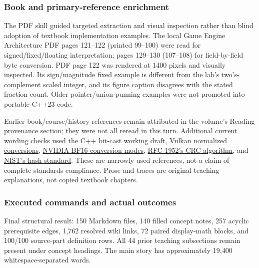 \subsubsection{Book and primary-reference enrichment}\label{appendix-a103e7846d21-book-and-primary-reference-enrichment}

\hypertarget{appendix-a103e7846d21-book-and-primary-reference-enrichment}{}

The PDF skill guided targeted extraction and visual inspection rather than blind adoption of textbook implementation examples. The local Game Engine Architecture PDF pages 121--122 (printed 99--100) were read for signed/fixed/floating interpretation; pages 129--130 (107--108) for field-by-field byte conversion. PDF page 122 was rendered at 1400 pixels and visually inspected. Its sign/magnitude fixed example is different from the lab's two's-complement scaled integer, and its figure caption disagrees with the stated fraction count. Older pointer/union-punning examples were not promoted into portable C++23 code.

Earlier book/course/history references remain attributed in the volume's Reading provenance section; they were not all reread in this turn. Additional current wording checks used the \href{https://eel.is/c++draft/bit.cast}{C++ bit-cast working draft}, \href{https://docs.vulkan.org/spec/latest/chapters/fundamentals.html\#fundamentals-fixedfpconv}{Vulkan normalized conversions}, \href{https://docs.nvidia.com/cuda/cuda-math-api/cuda_math_api/group__CUDA__MATH____BFLOAT16__MISC.html}{NVIDIA BF16 conversion modes}, \href{https://www.rfc-editor.org/rfc/rfc1952\#section-8}{RFC 1952's CRC algorithm}, and \href{https://csrc.nist.gov/pubs/fips/180-4/upd1/final}{NIST's hash standard}. These are narrowly used references, not a claim of complete standards compliance. Prose and traces are original teaching explanations, not copied textbook chapters.

\subsubsection{Executed commands and actual outcomes}\label{appendix-a103e7846d21-executed-commands-and-actual-outcomes}

\hypertarget{appendix-a103e7846d21-executed-commands-and-actual-outcomes}{}

Final structural result: 150 Markdown files, 140 filled concept notes, 257 acyclic prerequisite edges, 1,762 resolved wiki links, 72 paired display-math blocks, and 100/100 source-part definition rows. All 44 prior teaching subsections remain present under concept headings. The main story has approximately 19,400 whitespace-separated words.

